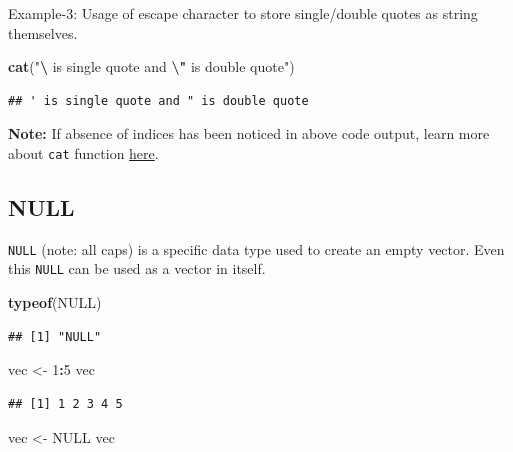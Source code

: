 \documentclass[
]{book}
\newenvironment{Shaded}{\begin{snugshade}}{\end{snugshade}}
\newcommand{\ConstantTok}[1]{\textcolor[rgb]{0.56,0.35,0.01}{#1}}
\newcommand{\DecValTok}[1]{\textcolor[rgb]{0.00,0.00,0.81}{#1}}
\newcommand{\FunctionTok}[1]{\textcolor[rgb]{0.13,0.29,0.53}{\textbf{#1}}}
\newcommand{\NormalTok}[1]{#1}
\newcommand{\OtherTok}[1]{\textcolor[rgb]{0.56,0.35,0.01}{#1}}
\newcommand{\SpecialCharTok}[1]{\textcolor[rgb]{0.81,0.36,0.00}{\textbf{#1}}}
\newcommand{\StringTok}[1]{\textcolor[rgb]{0.31,0.60,0.02}{#1}}
\begin{document}
Example-3: Usage of escape character to store single/double quotes as string themselves.

\begin{Shaded}
\begin{Highlighting}[]
\FunctionTok{cat}\NormalTok{(}\StringTok{"}\SpecialCharTok{\textbackslash{}\textquotesingle{}}\StringTok{ is single quote and }\SpecialCharTok{\textbackslash{}"}\StringTok{ is double quote"}\NormalTok{)}
\end{Highlighting}
\end{Shaded}

\begin{verbatim}
## ' is single quote and " is double quote
\end{verbatim}

\textbf{Note:} If absence of indices has been noticed in above code output, learn more about \texttt{cat} function \protect\hyperlink{cat}{here}.

\hypertarget{null}{%
\subsection{NULL}\label{null}}

\texttt{NULL} (note: all caps) is a specific data type used to create an empty vector. Even this \texttt{NULL} can be used as a vector in itself.

\begin{Shaded}
\begin{Highlighting}[]
\FunctionTok{typeof}\NormalTok{(}\ConstantTok{NULL}\NormalTok{)}
\end{Highlighting}
\end{Shaded}

\begin{verbatim}
## [1] "NULL"
\end{verbatim}

\begin{Shaded}
\begin{Highlighting}[]
\NormalTok{vec }\OtherTok{\textless{}{-}} \DecValTok{1}\SpecialCharTok{:}\DecValTok{5}
\NormalTok{vec}
\end{Highlighting}
\end{Shaded}

\begin{verbatim}
## [1] 1 2 3 4 5
\end{verbatim}

\begin{Shaded}
\begin{Highlighting}[]
\NormalTok{vec }\OtherTok{\textless{}{-}} \ConstantTok{NULL}
\NormalTok{vec}
\end{Highlighting}
\end{Shaded}
\end{document}
